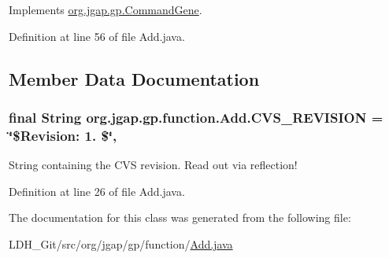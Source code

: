 Implements \hyperlink{classorg_1_1jgap_1_1gp_1_1_command_gene_a236141d99059da808afe7a9217e411c7}{org.\-jgap.\-gp.\-Command\-Gene}.



Definition at line 56 of file Add.\-java.



\subsection{Member Data Documentation}
\hypertarget{classorg_1_1jgap_1_1gp_1_1function_1_1_add_af211bdec40bd7f32aebf9f5436864e76}{
\subsubsection[{C\-V\-S\-\_\-\-R\-E\-V\-I\-S\-I\-O\-N}]{\setlength{\rightskip}{0pt plus 5cm}final String org.\-jgap.\-gp.\-function.\-Add.\-C\-V\-S\-\_\-\-R\-E\-V\-I\-S\-I\-O\-N = \char`\"{}\$Revision\-: 1. \$\char`\"{}\hspace{0.3cm}{\ttfamily [static]}, {\ttfamily [private]}}}\label{classorg_1_1jgap_1_1gp_1_1function_1_1_add_af211bdec40bd7f32aebf9f5436864e76}
String containing the C\-V\-S revision. Read out via reflection! 

Definition at line 26 of file Add.\-java.



The documentation for this class was generated from the following file\-:\begin{DoxyCompactItemize}
\item 
L\-D\-H\-\_\-\-Git/src/org/jgap/gp/function/\hyperlink{_add_8java}{Add.\-java}\end{DoxyCompactItemize}
